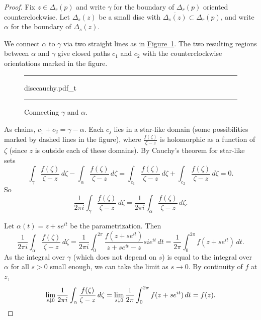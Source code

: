\documentclass[12pt,openany]{book}
\theoremstyle{plain}
\theoremstyle{remark}
\theoremstyle{definition}
\newenvironment{myfig}{%
\begin{figure}[h!t]
\noindent\rule{\textwidth}{0.5pt}\vspace{12pt}\par\centering}%
{\par\noindent\rule{\textwidth}{0.5pt}
\end{figure}}
\theoremstyle{exercise}
\theoremstyle{example}
\newcommand{\figureref}[1]{\hyperref[#1]{Figure~\ref*{#1}}}
\begin{document}
\begin{proof}
Fix $z \in \Delta_r(p)$ and write
$\gamma$ for the boundary of $\Delta_r(p)$ oriented counterclockwise.
Let $\Delta_s(z)$ be a small disc with $\overline{\Delta_s(z)} \subset
\Delta_r(p)$, and write $\alpha$ for the boundary of $\Delta_s(z)$.

We connect $\alpha$ to $\gamma$
via two straight lines as in \figureref{fig:disccauchy}.
The two resulting regions between $\alpha$ and $\gamma$
give closed paths $c_1$ and $c_2$ with the counterclockwise
orientations marked in the figure.
\begin{myfig}
{disccauchy.pdf_t}
\caption{Connecting $\gamma$ and $\alpha$.%
\label{fig:disccauchy}}
\end{myfig}

As chains, $c_1+c_2 = \gamma - \alpha$.  Each
$c_j$ lies in a star-like domain (some possibilities marked by dashed lines in the figure),
where $\frac{f(\zeta)}{\zeta-z}$ is holomorphic
as a function of $\zeta$ (since $z$ is outside each of these domains).
By Cauchy's theorem for star-like sets
\begin{equation*}
\int_{\gamma} \frac{f(\zeta)}{\zeta-z} \, d\zeta -
\int_{\alpha} \frac{f(\zeta)}{\zeta-z} \, d\zeta =
\int_{c_1} \frac{f(\zeta)}{\zeta-z} \, d\zeta + 
\int_{c_2} \frac{f(\zeta)}{\zeta-z} \, d\zeta = 0 .
\end{equation*}
So
\begin{equation*}
\frac{1}{2\pi i}
\int_{\gamma} \frac{f(\zeta)}{\zeta-z} \, d\zeta =
\frac{1}{2\pi i}
\int_{\alpha} \frac{f(\zeta)}{\zeta-z} \, d\zeta .
\end{equation*}

Let $\alpha(t) = z+s e^{i t}$ be the parametrization.
Then
\begin{equation*}
\frac{1}{2\pi i}
\int_{\alpha}
\frac{f(\zeta)}{\zeta-z}
\,
d \zeta
=
\frac{1}{2\pi i}
\int_0^{2\pi} \frac{f(z+se^{it})}{z + se^{it} - z} s i e^{it} \, dt
=
\frac{1}{2\pi}
\int_0^{2\pi} f(z+se^{it}) \, dt .
\end{equation*}
As the integral over $\gamma$ (which does not depend on $s$)
is equal to the integral over $\alpha$ for all $s > 0$ small enough,
we can take the limit as $s \to 0$.
By continuity of $f$ at $z$,
\begin{equation*}
\lim_{s \downarrow 0}
\frac{1}{2\pi i}
\int_{\alpha}
\frac{f(\zeta)}{\zeta-z}
\,
d \zeta
=
\lim_{s \downarrow 0}
\frac{1}{2\pi}
\int_0^{2\pi} f(z+se^{it}) \, dt
=
f(z) . \qedhere
\end{equation*}
\end{proof}
\end{document}
